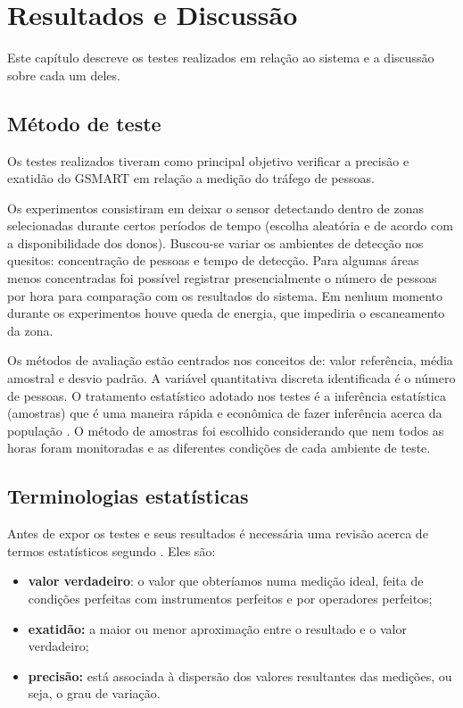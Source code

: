 \chapter{Resultados e Discussão}
\label{resultados-discussao}

Este capítulo descreve os testes realizados em relação ao sistema e a discussão sobre cada um deles.

\section{Método de teste}
\label{metodo-teste}
Os testes realizados tiveram como principal objetivo verificar a precisão e exatidão do GSMART em relação a
medição do tráfego de pessoas.

Os experimentos consistiram em deixar o sensor detectando dentro de zonas
selecionadas durante certos períodos de tempo (escolha aleatória e de acordo com a disponibilidade
dos donos). Buscou-se variar os ambientes de
detecção nos quesitos: concentração de pessoas e tempo de detecção. Para algumas
áreas menos concentradas foi possível registrar presencialmente o número de
pessoas por hora para comparação com os resultados do sistema. Em nenhum momento durante os experimentos
houve queda de energia, que impediria o escaneamento da zona.

Os métodos de avaliação estão centrados nos conceitos de: valor referência, média amostral e desvio padrão.
A variável quantitativa discreta identificada é o número de pessoas. O tratamento estatístico adotado nos testes
é a inferência estatística (amostras) que é uma maneira rápida e econômica de fazer
inferência acerca da população \cite{Cabral2004}. O método de amostras
foi escolhido considerando que nem todos as horas foram monitoradas e as diferentes condições de
cada ambiente de teste.

\section{Terminologias estatísticas}
Antes de expor os testes e seus resultados é necessária uma revisão acerca de termos estatísticos segundo . Eles são:
\begin{itemize}
    \item \textbf{valor verdadeiro}: o valor que obteríamos numa medição ideal, feita de condições
    perfeitas com instrumentos perfeitos e por operadores perfeitos;
    \item \textbf{exatidão:} a maior ou menor aproximação entre o resultado e o valor verdadeiro;
    \item \textbf{precisão:} está associada à dispersão dos valores resultantes das medições, ou seja, o grau de variação.
\end{itemize}

